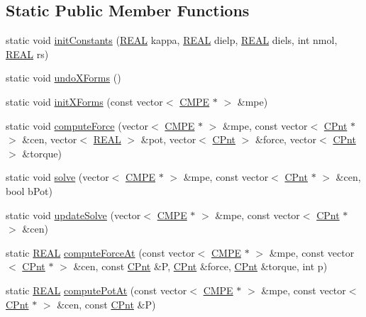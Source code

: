 \subsection*{Static Public Member Functions}
\begin{DoxyCompactItemize}
\item 
static void \hyperlink{classCMPE_accac27799cb676fb3160683583a8619e}{init\-Constants} (\hyperlink{util_8h_a5821460e95a0800cf9f24c38915cbbde}{R\-E\-A\-L} kappa, \hyperlink{util_8h_a5821460e95a0800cf9f24c38915cbbde}{R\-E\-A\-L} dielp, \hyperlink{util_8h_a5821460e95a0800cf9f24c38915cbbde}{R\-E\-A\-L} diels, int nmol, \hyperlink{util_8h_a5821460e95a0800cf9f24c38915cbbde}{R\-E\-A\-L} rs)
\item 
static void \hyperlink{classCMPE_a61688da6057b840ca71dacb47db0c0ac}{undo\-X\-Forms} ()
\item 
static void \hyperlink{classCMPE_a56b7e4c76e20d5e34393a72cc31f6bb3}{init\-X\-Forms} (const vector$<$ \hyperlink{classCMPE}{C\-M\-P\-E} $\ast$ $>$ \&mpe)
\item 
static void \hyperlink{classCMPE_ab825df6d8ab377af3715b86e3a495e34}{compute\-Force} (vector$<$ \hyperlink{classCMPE}{C\-M\-P\-E} $\ast$ $>$ \&mpe, const vector$<$ \hyperlink{classCPnt}{C\-Pnt} $\ast$ $>$ \&cen, vector$<$ \hyperlink{util_8h_a5821460e95a0800cf9f24c38915cbbde}{R\-E\-A\-L} $>$ \&pot, vector$<$ \hyperlink{classCPnt}{C\-Pnt} $>$ \&force, vector$<$ \hyperlink{classCPnt}{C\-Pnt} $>$ \&torque)
\item 
static void \hyperlink{classCMPE_a46bad2726842ca10071fd004010a6e1b}{solve} (vector$<$ \hyperlink{classCMPE}{C\-M\-P\-E} $\ast$ $>$ \&mpe, const vector$<$ \hyperlink{classCPnt}{C\-Pnt} $\ast$ $>$ \&cen, bool b\-Pot)
\item 
static void \hyperlink{classCMPE_a70e20d2a606e1bae88c117b15a511e17}{update\-Solve} (vector$<$ \hyperlink{classCMPE}{C\-M\-P\-E} $\ast$ $>$ \&mpe, const vector$<$ \hyperlink{classCPnt}{C\-Pnt} $\ast$ $>$ \&cen)
\item 
static \hyperlink{util_8h_a5821460e95a0800cf9f24c38915cbbde}{R\-E\-A\-L} \hyperlink{classCMPE_a7724d01cc2dc82b19e90e723ed2ba050}{compute\-Force\-At} (const vector$<$ \hyperlink{classCMPE}{C\-M\-P\-E} $\ast$ $>$ \&mpe, const vector$<$ \hyperlink{classCPnt}{C\-Pnt} $\ast$ $>$ \&cen, const \hyperlink{classCPnt}{C\-Pnt} \&P, \hyperlink{classCPnt}{C\-Pnt} \&force, \hyperlink{classCPnt}{C\-Pnt} \&torque, int p)
\item 
static \hyperlink{util_8h_a5821460e95a0800cf9f24c38915cbbde}{R\-E\-A\-L} \hyperlink{classCMPE_a8a6b260459ff6af55260e2c7897f3bd0}{compute\-Pot\-At} (const vector$<$ \hyperlink{classCMPE}{C\-M\-P\-E} $\ast$ $>$ \&mpe, const vector$<$ \hyperlink{classCPnt}{C\-Pnt} $\ast$ $>$ \&cen, const \hyperlink{classCPnt}{C\-Pnt} \&P)

\end{DoxyCompactItemize}
